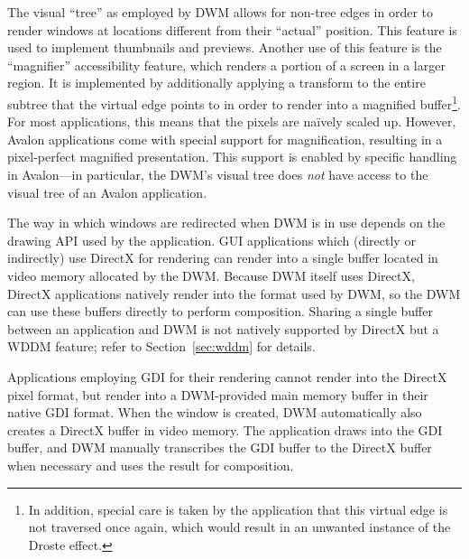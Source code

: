 \documentclass[10pt,twocolumn,a4paper]{article}
\begin{document}
			The visual \enquote{tree} as employed by DWM allows for non-tree edges
			in order to render windows at locations different from their \enquote{actual}
			position. This feature is used to implement thumbnails and previews.
			Another use of this feature is the \enquote{magnifier} accessibility
			feature, which renders a portion of a screen in a larger region.
			It is implemented by additionally applying a transform to the entire
			subtree that the virtual edge points to in order to render into a
			magnified buffer\footnote{In addition, special care is taken by the
			application
			that this virtual edge is not traversed once again, which would result
			in an unwanted instance of the Droste effect.}.
			For most applications, this means that the pixels are naïvely scaled
			up. However, Avalon applications come with special support for magnification,
			resulting in a pixel-perfect magnified presentation. This support
			is enabled by specific handling in Avalon---in particular, the DWM's
			visual tree does \emph{not} have access to the visual tree of an
			Avalon application.
			\cite{goingdeep}

			The way in which windows are redirected when DWM is in use depends
			on the drawing API used by the application. GUI applications which
			(directly or indirectly)
			use DirectX for rendering can render into a single buffer located
			in video memory allocated
			by the DWM. Because DWM itself uses DirectX, DirectX applications
			natively render into the format used by DWM, so the DWM can use
			these buffers directly to perform composition. Sharing a single buffer
			between an application and DWM is not natively supported by DirectX
			but a WDDM feature; refer to Section~\ref{sec:wddm} for details.
			\cite{dwmredirect}

			Applications employing GDI for their rendering cannot render into
			the DirectX pixel format, but render into a DWM-provided main memory
			buffer in their native GDI format. When the window is created, DWM
			automatically also creates a DirectX buffer in video memory. The
			application draws into the GDI buffer, and DWM manually transcribes
			the GDI buffer to the DirectX buffer when necessary and uses the result
			for composition.
			\cite{dwmredirect}
\end{document}
